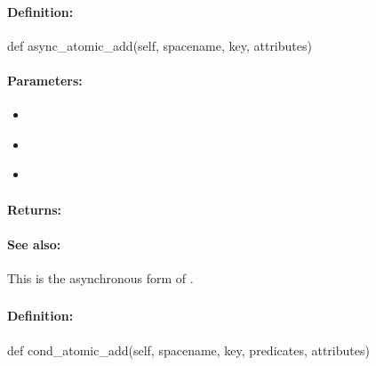 \paragraph{Definition:}
\begin{pythoncode}
def async_atomic_add(self, spacename, key, attributes)
\end{pythoncode}

\paragraph{Parameters:}
\begin{itemize}[noitemsep]
\item {}\\

\item {}\\

\item {}\\

\end{itemize}

\paragraph{Returns:}


\paragraph{See also:}  This is the asynchronous form of .

\pagebreak
\subsubsection{}
\label{api:python:cond_atomic_add}


\paragraph{Definition:}
\begin{pythoncode}
def cond_atomic_add(self, spacename, key, predicates, attributes)
\end{pythoncode}

